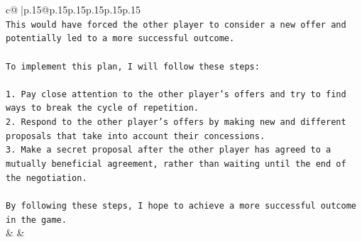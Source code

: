 \documentclass{article}
\begin{document}
{\begin{supertabular}{c@{$\;$}|p{.15\linewidth}@{}p{.15\linewidth}p{.15\linewidth}p{.15\linewidth}p{.15\linewidth}p{.15\linewidth}}
{{{\\ 
\texttt{This would have forced the other player to consider a new offer and potentially led to a more successful outcome.} \\
\\ 
\texttt{To implement this plan, I will follow these steps:} \\
\\ 
\texttt{1. Pay close attention to the other player's offers and try to find ways to break the cycle of repetition.} \\
\texttt{2. Respond to the other player's offers by making new and different proposals that take into account their concessions.} \\
\texttt{3. Make a secret proposal after the other player has agreed to a mutually beneficial agreement, rather than waiting until the end of the negotiation.} \\
\\ 
\texttt{By following these steps, I hope to achieve a more successful outcome in the game.} \\
            }
        }
    }
    & & \\ \\


\end{supertabular}}
\end{document}
